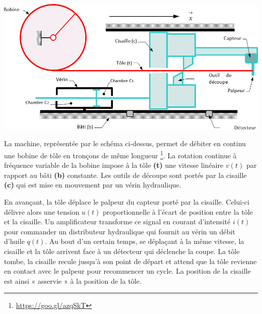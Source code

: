 \documentclass[10pt,fleqn]{article} %
\begin{document}
\def\pathfig{images}

\vspace{8cm}
\pagestyle{fancy}
\thispagestyle{plain}

\def\columnseprulecolor{\color{ocre}}
\setlength{\columnseprule}{0.4pt} 

\def\pathfig{images}

\begin{multicols}{2}

\begin{center}
\includegraphics[width=\linewidth]{images/fig_01}
\end{center}

La machine, représentée par le schéma ci-dessus, permet de débiter en continu une bobine de tôle en tronçons de même longueur \footnote{
\url{https://goo.gl/azqSkT}}. La rotation continue à fréquence variable de la bobine impose à la tôle \textbf{(t)} une vitesse linéaire $v(t)$ par rapport au bâti \textbf{(b)} constante.
Les outils de découpe sont portés par la cisaille \textbf{(c)} qui est mise en mouvement par un vérin hydraulique.

En avançant, la tôle déplace le palpeur du capteur porté par la cisaille. Celui-ci délivre alors une tension $u(t)$ proportionnelle à l'écart de position entre la tôle et la cisaille. Un amplificateur transforme ce signal en courant d'intensité $i(t)$ pour commander un distributeur hydraulique qui fournit au vérin un débit d'huile $q(t)$. Au bout d'un certain temps, se déplaçant à la même vitesse, la cisaille et la tôle arrivent face à un détecteur qui déclenche la coupe. La tôle tombe, la cisaille recule jusqu'à son point de départ et attend que la tôle revienne en contact avec le palpeur pour recommencer un cycle. La position de la cisaille est ainsi « asservie » à la position de la tôle.


\end{multicols}
\end{document}
